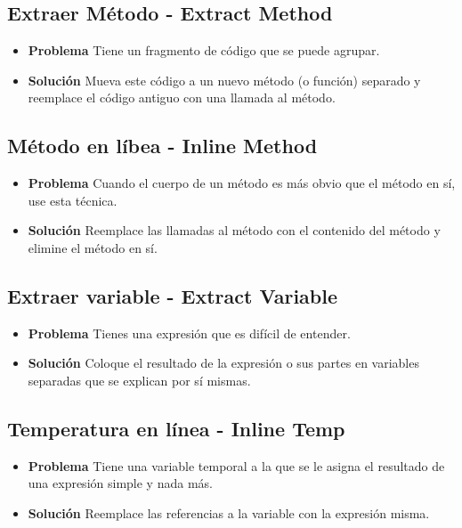 \documentclass[11pt,a4paper,oneside]{book}
\begin{document}
\subsection{Extraer Método  - Extract Method}
\label{extractmethod}
\begin{itemize}
    \item \textbf{Problema} Tiene un fragmento de código que se puede agrupar.
    \item \textbf{Solución} Mueva este código a un nuevo método (o función) separado y reemplace el código antiguo con una llamada al método.
\end{itemize}


    
\subsection{Método en líbea - Inline Method}
\label{inlinemethod}
\begin{itemize}
    \item \textbf{Problema} Cuando el cuerpo de un método es más obvio que el método en sí, use esta técnica.
    \item \textbf{Solución} Reemplace las llamadas al método con el contenido del método y elimine el método en sí.
\end{itemize}



\subsection{Extraer variable - Extract Variable}
\label{extracvariable}
\begin{itemize}
    \item \textbf{Problema} Tienes una expresión que es difícil de entender.
    \item \textbf{Solución} Coloque el resultado de la expresión o sus partes en variables separadas que se explican por sí mismas.
\end{itemize}


    
\subsection{Temperatura en línea - Inline Temp}
\label{inlinetemp}
\begin{itemize}
    \item \textbf{Problema} Tiene una variable temporal a la que se le asigna el resultado de una expresión simple y nada más.
    \item \textbf{Solución} Reemplace las referencias a la variable con la expresión misma.
\end{itemize}


    
\end{document}
